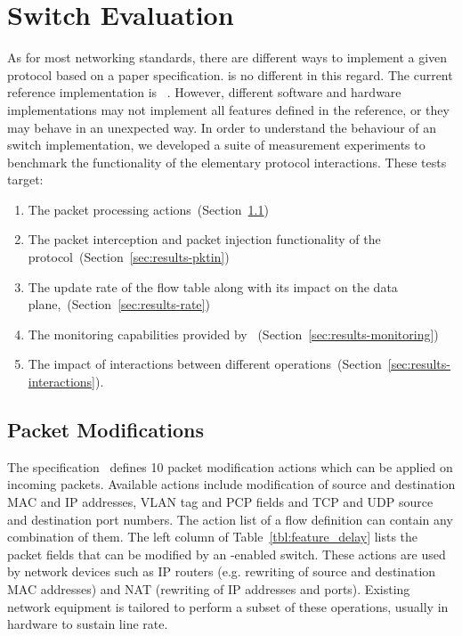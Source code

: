 \section{Switch Evaluation}\label{sec:oflops-result}

As for most networking standards, there are different ways to implement a given
protocol based on a paper specification. \of is no different in this regard. The
current \of reference implementation is \ovs~. However,
different software and hardware implementations may not implement all features
defined in the \ovs reference, or they may behave in an unexpected way. In order
to understand the behaviour of an \of switch implementation, we developed a suite of
measurement experiments to benchmark the functionality of the elementary
protocol interactions.  These tests target: 
\begin{enumerate}
  \item The \of packet processing actions~(Section~\ref{sec:results-packets})
  \item The packet interception and packet injection functionality of the
        protocol~(Section~\ref{sec:results-pktin})
  \item The update rate of the flow table along with its impact on the data
        plane,~(Section~\ref{sec:results-rate})
  \item The monitoring capabilities provided by
        \of~(Section~\ref{sec:results-monitoring})
  \item The impact of interactions between different \of
        operations~(Section~\ref{sec:results-interactions}).  
\end{enumerate}


\subsection{Packet Modifications}\label{sec:results-packets}

The  specification~ defines 10 packet modification
actions which can be applied on incoming packets. Available actions include
modification of source and destination MAC and IP addresses, VLAN tag and PCP
fields and TCP and UDP source and destination port numbers. The action list
of a flow definition can contain any combination of them. The left column of
Table~\ref{tbl:feature_delay} lists the packet fields that can be modified by an
\of-enabled switch.  These actions are used by network devices such as IP
routers (e.g. rewriting of source and destination MAC addresses) and NAT
(rewriting of IP addresses and ports). Existing network equipment is tailored to
perform a subset of these operations, usually in hardware to sustain line rate.

